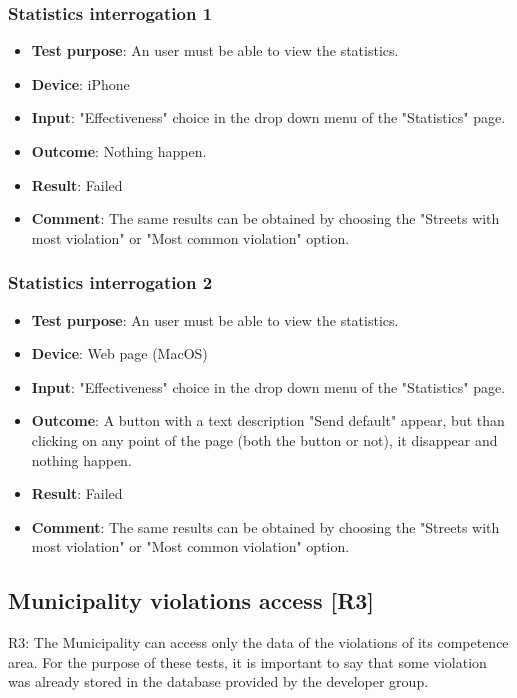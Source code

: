 \documentclass[../ATD.tex]{subfiles}
\begin{document}
    \subsubsection{Statistics interrogation 1}\label{subsubsec:statistics-interrogation-1}
    \begin{itemize}
        \item \textbf{Test purpose}: An user must be able to view the statistics.
        \item \textbf{Device}: iPhone
        \item \textbf{Input}: "Effectiveness" choice in the drop down menu of the "Statistics" page.
        \item \textbf{Outcome}: Nothing happen.
        \item \textbf{Result}: Failed
        \item \textbf{Comment}: The same results can be obtained by choosing the "Streets with most violation" or "Most common violation" option.
    \end{itemize}

    \subsubsection{Statistics interrogation 2}\label{subsubsec:statistics-interrogation-2}
    \begin{itemize}
        \item \textbf{Test purpose}: An user must be able to view the statistics.
        \item \textbf{Device}: Web page (MacOS)
        \item \textbf{Input}: "Effectiveness" choice in the drop down menu of the "Statistics" page.
        \item \textbf{Outcome}: A button with a text description "Send default" appear, but than clicking on any point of the page (both the button or not), it disappear and nothing happen.
        \item \textbf{Result}: Failed
        \item \textbf{Comment}: The same results can be obtained by choosing the "Streets with most violation" or "Most common violation" option.
    \end{itemize}

    \subsection{Municipality violations access [R3]}\label{subsec:municipality-report-access}
    R3: The Municipality can access only the data of the violations of its competence area.
    \newline
    For the purpose of these tests, it is important to say that some violation was already stored in the database provided by the developer group.
\end{document}
